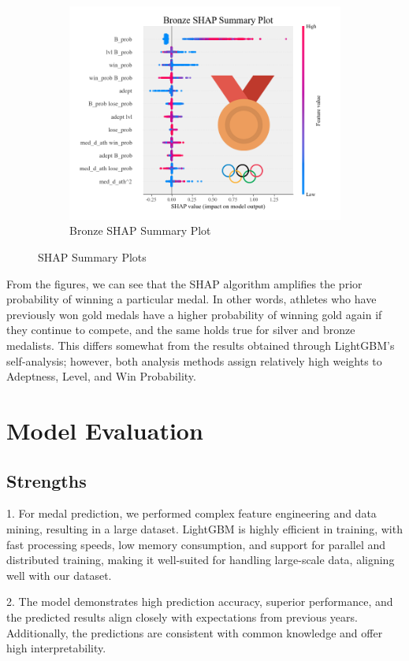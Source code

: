 \documentclass[12pt]{article}  %
\begin{document}
\begin{figure}[H]
\begin{subfigure}[b]{.32\textwidth}
		\includegraphics[width=\textwidth]{img/shap3.png}
		\caption{Bronze SHAP Summary Plot}\label{subfig:3}
	\end{subfigure}
	\caption{SHAP Summary Plots}\label{fig:subfigures}
\end{figure}
From the figures, we can see that the SHAP algorithm amplifies the prior probability of winning a particular medal\cite{4}. In other words, athletes who have previously won gold medals have a higher probability of winning gold again if they continue to compete, and the same holds true for silver and bronze medalists. This differs somewhat from the results obtained through LightGBM's self-analysis; however, both analysis methods assign relatively high weights to Adeptness, Level, and Win Probability.

\section{Model Evaluation}
\subsection{Strengths}
1. For medal prediction, we performed complex feature engineering and data mining, resulting in a large dataset. LightGBM is highly efficient in training, with fast processing speeds, low memory consumption, and support for parallel and distributed training, making it well-suited for handling large-scale data, aligning well with our dataset.

2. The model demonstrates high prediction accuracy, superior performance, and the predicted results align closely with expectations from previous years. Additionally, the predictions are consistent with common knowledge and offer high interpretability.
\end{document}

